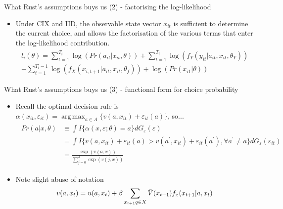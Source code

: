 \documentclass[aspectratio=169]{beamer}
\DeclareMathOperator*{\argmax}{arg\,max}
\begin{document}
	\begin{frame}{What Rust's assumptions buys us (2) - factorising the log-likelihood}
		\begin{itemize}
			\itemsep1em 
			\item Under CIX and IID, the observable state vector $x_{it}$ is sufficient to determine the current choice, and allows the factorisation of the various terms that enter the log-likelihood contribution. 
			\begin{align} 
				\begin{split} \label{eq:loglik}
					l_i(\theta) = \sum_{t=1}^{T_i} \log(Pr(a_{it}|x_{it},\theta))+ \sum_{t=1}^{T_i} \log(f_Y(y_{it}|a_{it},x_{it},\theta_Y)) \\
					+ \sum_{t=1}^{T_i - 1}\log(f_X(x_{i,t+1}|a_{it},x_{it},\theta_f)) + \log(Pr(x_{i1}|\theta))           
				\end{split}
			\end{align}
			
		\end{itemize}
	\end{frame}
	
	\begin{frame}{What Rust's assumptions buys us (3) - functional form for choice probability}
		\begin{itemize}
			\itemsep1em
			\item Recall the optimal decision rule is $\alpha(x_{it},\varepsilon_{it}) = \argmax_{a \in A} \{v(a,x_{it}) + \varepsilon_{it}(a)\}$, so...
			\begin{align}
				\begin{split}
					Pr(a|x,\theta) &\equiv \int I\{\alpha(x,\varepsilon;\theta) = a\} dG_\varepsilon(\varepsilon) \\
					&= \int I\{v(a,x_{it}) + \varepsilon_{it}(a) > v(a^\prime, x_{it}) + \varepsilon_{it}(a^\prime), \forall a^\prime \neq a\} dG_\varepsilon(\varepsilon_{it}) \\
					&= \frac{\exp(v(a,x))}{\sum_{j=0}^J\exp(v(j,x))}
				\end{split}
			\end{align}
			\item Note slight abuse of notation
			\begin{equation*}
				v(a,x_t) = u(a,x_t) + \beta \sum_{x_{t+1}q \in X} \Bar{V}(x_{t+1}) f_x(x_{t+1}|a,x_t) 
			\end{equation*}
		\end{itemize}
	\end{frame}
	
\end{document}

